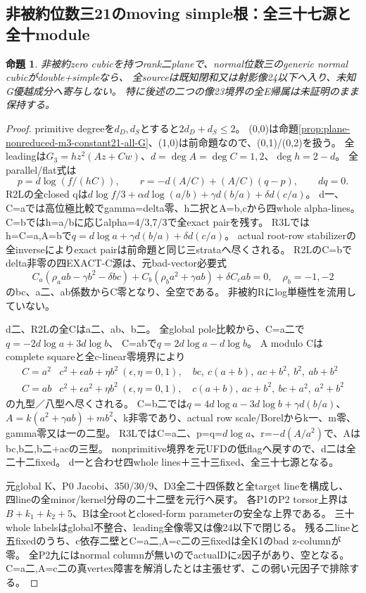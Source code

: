 \documentclass[a4paper,11pt]{ltjsarticle}
\newtheorem{proposition}{命題}[section]
\theoremstyle{definition}
\begin{document}
\subsection{非被約位数三21のmoving simple根：全三十七源と全十module}
\begin{proposition}\label{prop:plane-nonreduced-m3-generic21-all-G}
非被約zero cubicを持つrank二planeで、normal位数三のgeneric normal cubicがdouble+simpleなら、
全sourceは既知閉和又は射影像24以下へ入り、未知G優越成分へ寄与しない。
特に後述の二つの像23境界の全E帰属は未証明のまま保持する。
\end{proposition}
\begin{proof}
primitive degreeを$d_D,d_S$とすると$2d_D+d_S\le2$。
(0,0)は命題\ref{prop:plane-nonreduced-m3-constant21-all-G}、(1,0)は前命題なので、(0,1)/(0,2)を扱う。
全leadingは$G_3=h z^2(Az+Cw)$、$d=\deg A=\deg C=1,2$、$\deg h=2-d$。
全parallel/flat式は
\[
 p=d\log(f/(hC)),\qquad r=-d(A/C)+(A/C)(q-p),\qquad dq=0.
\]
R2Lの全closed qは$d\log f/3+\alpha d\log(a/b)+\gamma d(b/a)+\delta d(c/a)$。
d一、C=aでは高位極比較でgamma=delta零、h二択とA=b,cから四whole alpha-lines。
C=bではh=a/bに応じalpha=4/3,7/3で全exact pairを残す。
R3Lではh=C=a,A=bで$q=d\log a+\gamma d(b/a)+\delta d(c/a)$。
actual root-row stabilizerの全inverseによりexact pairは前命題と同じ三strataへ尽くされる。
R2LのC=bでdelta非零の四EXACT-C源は、元bad-vector必要式
\[
 C_a(\rho_aab-\gamma b^2-\delta bc)+C_b(\rho_ba^2+\gamma ab)+\delta C_cab=0,
 \quad\rho_b=-1,-2
\]
のbc、a二、ab係数からC零となり、全空である。
非被約Rにlog単極性を流用していない。

d二、R2Lの全Cはa二、ab、b二。
全global pole比較から、C=a二で$q=-2d\log a+3d\log b$、
C=abで$q=2d\log a-d\log b$。
A modulo Cはcomplete squareと全c-linear零境界により
\[
\begin{array}{c|l}
 C=a^2&c^2+\epsilon ab+\eta b^2\ (\epsilon,\eta=0,1),\quad
 bc,\ c(a+b),\ ac+b^2,\ b^2,\ ab+b^2\\
 C=ab&c^2+\epsilon a^2+\eta b^2\ (\epsilon,\eta=0,1),\quad
 c(a+b),\ ac+b^2,\ bc+a^2,\ a^2+b^2
\end{array}
\]
の九型／八型へ尽くされる。
C=b二では$q=4d\log a-3d\log b+\gamma d(b/a)$、
$A=k(a^2+\gamma ab)+mb^2$、k非零であり、actual row scale/Borelからk一、m零、gamma零又は一の二型。
R3LではC=a二、p=q=$d\log a$、r=$-d(A/a^2)$で、Aはbc,b二,b二+acの三型。
nonprimitive境界を元UFDの低flagへ戻すので、d二は全二十二fixed。
d一と合わせ四whole lines＋三十三fixed、全三十七源となる。

元global K、P0 Jacobi、350/30/9、D3全二十四係数と全target lineを構成し、
四lineの全minor/kernel分母の二十二壁を元行へ戻す。
各P1のP2 torsor上界は$B+k_1+k_2+5$、Bは全rootとclosed-form parameterの安全な上界である。
三十whole labelsはglobal不整合、leading全像零又は像24以下で閉じる。
残る二lineと五fixedのうち、c依存二壁とC=a二,A=c二の三fixedは全K1のbad z-columnが零。
全P2九にはnormal columnが無いのでactualDにz因子があり、空となる。
C=a二,A=c二の真vertex障害を解消したとは主張せず、この弱い元因子で排除する。


\end{proof}
\end{document}
